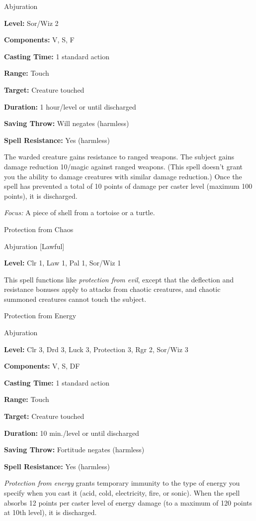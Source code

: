 \documentclass{article}
\begin{document}
Abjuration

\textbf{Level:} Sor/Wiz 2

\textbf{Components:} V, S, F

\textbf{Casting Time:} 1 standard action

\textbf{Range:} Touch

\textbf{Target:} Creature touched

\textbf{Duration:} 1 hour/level or until discharged

\textbf{Saving Throw: }Will negates (harmless)

\textbf{Spell Resistance:} Yes (harmless)

The warded creature gains resistance to ranged weapons. The subject gains damage 
reduction 10/magic against ranged weapons. (This spell doesn't grant you the ability 
to damage creatures with similar damage reduction.) Once the spell has prevented 
a total of 10 points of damage per caster level (maximum 100 points), it is discharged.

\textit{Focus: }A piece of shell from a tortoise or a turtle.

\vspace{12pt}
Protection from Chaos

Abjuration [Lawful]

\textbf{Level:} Clr 1, Law 1, Pal 1, Sor/Wiz 1

This spell functions like \textit{protection from evil}, except that the deflection 
and resistance bonuses apply to attacks from chaotic creatures, and chaotic summoned 
creatures cannot touch the subject.

\vspace{12pt}
Protection from Energy

Abjuration

\textbf{Level:} Clr 3, Drd 3, Luck 3, Protection 3, Rgr 2, Sor/Wiz 3

\textbf{Components:} V, S, DF

\textbf{Casting Time:} 1 standard action

\textbf{Range:} Touch

\textbf{Target:} Creature touched

\textbf{Duration:} 10 min./level or until discharged

\textbf{Saving Throw:} Fortitude negates (harmless)

\textbf{Spell Resistance:} Yes (harmless)

\textit{Protection from energy }grants temporary immunity to the type of energy 
you specify when you cast it (acid, cold, electricity, fire, or sonic). When the 
spell absorbs 12 points per caster level of energy damage (to a maximum of 120 
points at 10th level), it is discharged.
\end{document}

